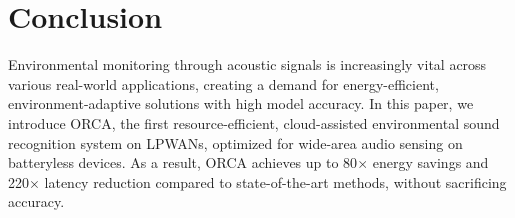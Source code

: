 \section{Conclusion}
Environmental monitoring through acoustic signals is increasingly vital across various real-world applications, creating a demand for energy-efficient, environment-adaptive solutions with high model accuracy. In this paper, we introduce ORCA, the first resource-efficient, cloud-assisted environmental sound recognition system on LPWANs, optimized for wide-area audio sensing on batteryless devices.  As a result, ORCA achieves up to 80$\times$ energy savings and 220$\times$ latency reduction compared to state-of-the-art methods, without sacrificing accuracy.







